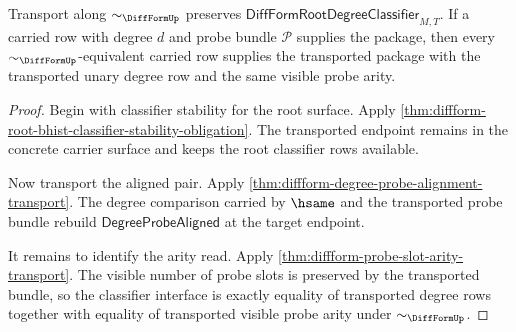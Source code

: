 \begin{theorem}
\label{thm:diffform-root-degree-classifier-transport}
Transport along $\sim_{\DiffFormUp}$ preserves
$\mathsf{DiffFormRootDegreeClassifier}_{M,T}$. If a carried row with degree
$d$ and probe bundle $\mathcal{P}$ supplies the package, then every
$\sim_{\DiffFormUp}$-equivalent carried row supplies the transported package
with the transported unary degree row and the same visible probe arity.
\end{theorem}
\begin{proof}
Begin with classifier stability for the root surface. Apply
\autoref{thm:diffform-root-bhist-classifier-stability-obligation}. The
transported endpoint remains in the concrete carrier surface and keeps the
root classifier rows available.

Now transport the aligned pair. Apply
\autoref{thm:diffform-degree-probe-alignment-transport}. The degree
comparison carried by $\hsame$ and the transported probe bundle rebuild
$\mathsf{DegreeProbeAligned}$ at the target endpoint.

It remains to identify the arity read. Apply
\autoref{thm:diffform-probe-slot-arity-transport}. The visible number of
probe slots is preserved by the transported bundle, so the classifier
interface is exactly equality of transported degree rows together with
equality of transported visible probe arity under $\sim_{\DiffFormUp}$.
\end{proof}


